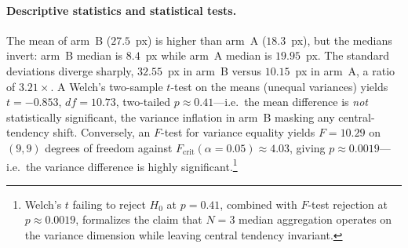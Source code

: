 \begin{table}[t]
  \centering
  \small
  \caption{Per-case precision pinpoint distance (px) for
    arm~A ($N=3$ median) versus arm~B ($N=1$).
    \textbf{Bold} entries flag $>50$~px gross-error outliers
    in arm~B (absent from arm~A).}
  \label{tab:aggregation-percase}
\end{table}

\paragraph{Descriptive statistics and statistical tests.}
The mean of arm~B ($27.5$~px) is higher than arm~A ($18.3$~px),
but the medians invert: arm~B median is $8.4$~px while arm~A
median is $19.95$~px.  The standard deviations diverge sharply,
$32.55$~px in arm~B versus $10.15$~px in arm~A, a ratio of
$3.21\times$.  A Welch's two-sample $t$-test on the means
(unequal variances) yields $t=-0.853$, $df=10.73$, two-tailed
$p\approx 0.41$---i.e.\ the mean difference is \emph{not}
statistically significant, the variance inflation in arm~B
masking any central-tendency shift.  Conversely, an $F$-test
for variance equality yields $F=10.29$ on $(9,9)$ degrees of
freedom against $F_{\text{crit}}(\alpha=0.05)\approx 4.03$,
giving $p\approx 0.0019$---i.e.\ the variance difference is highly
significant.\footnote{Welch's $t$ failing to reject $H_0$ at
$p=0.41$, combined with $F$-test rejection at $p \approx 0.0019$,
formalizes the claim that $N=3$ median aggregation operates
on the variance dimension while leaving central tendency
invariant.}

